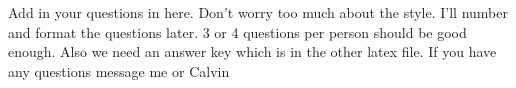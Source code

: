 \documentclass[12pt]{article}
\begin{document}
Add in your questions in here. Don't worry too much about the style. I'll number and format the questions later. 3 or 4 questions per person should be good enough. Also we need an answer key which is in the other latex file. If you have any questions message me or Calvin 
\end{document}
